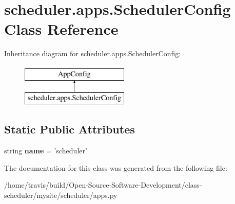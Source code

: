 \hypertarget{classscheduler_1_1apps_1_1_scheduler_config}{\section{scheduler.\-apps.\-Scheduler\-Config Class Reference}
\label{classscheduler_1_1apps_1_1_scheduler_config}
}
Inheritance diagram for scheduler.\-apps.\-Scheduler\-Config\-:\begin{figure}[H]
\begin{center}
\leavevmode
\includegraphics[height=2.000000cm]{classscheduler_1_1apps_1_1_scheduler_config}
\end{center}
\end{figure}
\subsection*{Static Public Attributes}
\begin{DoxyCompactItemize}
\item 
\hypertarget{classscheduler_1_1apps_1_1_scheduler_config_aebb64410f42031cde5364a964e8c85b3}{string {\bfseries name} = 'scheduler'}\label{classscheduler_1_1apps_1_1_scheduler_config_aebb64410f42031cde5364a964e8c85b3}

\end{DoxyCompactItemize}


The documentation for this class was generated from the following file\-:\begin{DoxyCompactItemize}
\item 
/home/travis/build/\-Open-\/\-Source-\/\-Software-\/\-Development/class-\/scheduler/mysite/scheduler/apps.\-py\end{DoxyCompactItemize}
